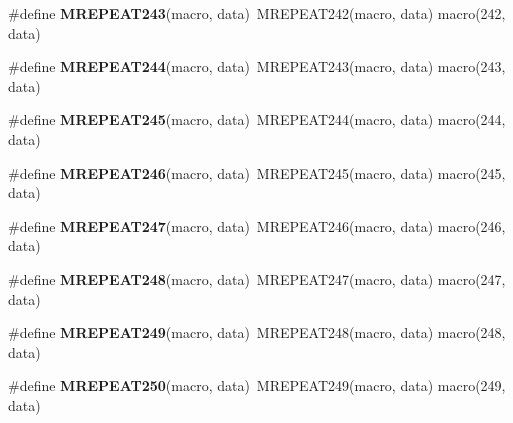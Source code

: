 \begin{DoxyCompactItemize}
\item 
\hypertarget{group__group__xmega__utils__mrepeat_ga3780c0d880e8f0fef0b734f8491388a1}{\#define {\bfseries M\-R\-E\-P\-E\-A\-T243}(macro, data)~M\-R\-E\-P\-E\-A\-T242(macro, data)   macro(242, data)}\label{group__group__xmega__utils__mrepeat_ga3780c0d880e8f0fef0b734f8491388a1}

\item 
\hypertarget{group__group__xmega__utils__mrepeat_ga96b96568f137828bd94f1df72f9ea533}{\#define {\bfseries M\-R\-E\-P\-E\-A\-T244}(macro, data)~M\-R\-E\-P\-E\-A\-T243(macro, data)   macro(243, data)}\label{group__group__xmega__utils__mrepeat_ga96b96568f137828bd94f1df72f9ea533}

\item 
\hypertarget{group__group__xmega__utils__mrepeat_gaef88abd24a21c1424bcef16151f33acc}{\#define {\bfseries M\-R\-E\-P\-E\-A\-T245}(macro, data)~M\-R\-E\-P\-E\-A\-T244(macro, data)   macro(244, data)}\label{group__group__xmega__utils__mrepeat_gaef88abd24a21c1424bcef16151f33acc}

\item 
\hypertarget{group__group__xmega__utils__mrepeat_ga648b2d33e6ae37d7f576055603bcb620}{\#define {\bfseries M\-R\-E\-P\-E\-A\-T246}(macro, data)~M\-R\-E\-P\-E\-A\-T245(macro, data)   macro(245, data)}\label{group__group__xmega__utils__mrepeat_ga648b2d33e6ae37d7f576055603bcb620}

\item 
\hypertarget{group__group__xmega__utils__mrepeat_ga93c99f19dd27b6ad1c3921e4f473f50d}{\#define {\bfseries M\-R\-E\-P\-E\-A\-T247}(macro, data)~M\-R\-E\-P\-E\-A\-T246(macro, data)   macro(246, data)}\label{group__group__xmega__utils__mrepeat_ga93c99f19dd27b6ad1c3921e4f473f50d}

\item 
\hypertarget{group__group__xmega__utils__mrepeat_ga0bee84ef9cc1bc4f81563c8fc476fed4}{\#define {\bfseries M\-R\-E\-P\-E\-A\-T248}(macro, data)~M\-R\-E\-P\-E\-A\-T247(macro, data)   macro(247, data)}\label{group__group__xmega__utils__mrepeat_ga0bee84ef9cc1bc4f81563c8fc476fed4}

\item 
\hypertarget{group__group__xmega__utils__mrepeat_ga09e41b2792e87e2db97093c344127c3d}{\#define {\bfseries M\-R\-E\-P\-E\-A\-T249}(macro, data)~M\-R\-E\-P\-E\-A\-T248(macro, data)   macro(248, data)}\label{group__group__xmega__utils__mrepeat_ga09e41b2792e87e2db97093c344127c3d}

\item 
\hypertarget{group__group__xmega__utils__mrepeat_ga35656197f887f34430287ec13dc48193}{\#define {\bfseries M\-R\-E\-P\-E\-A\-T250}(macro, data)~M\-R\-E\-P\-E\-A\-T249(macro, data)   macro(249, data)}\label{group__group__xmega__utils__mrepeat_ga35656197f887f34430287ec13dc48193}


\end{DoxyCompactItemize}
